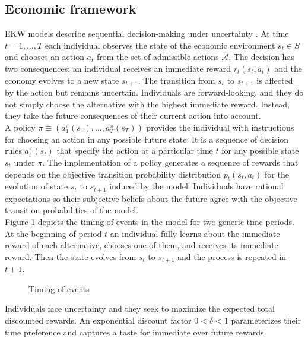 \subsection{Economic framework}
EKW models describe sequential decision-making under uncertainty \citep{Gilboa.2009, Machina.2014}. At time $t = 1, \hdots, T$ each individual observes the state of the economic environment $s_t\in S$ and chooses an action $a_t$ from the set of admissible actions $\mathcal{A}$. The decision has two consequences: an individual receives an immediate reward $r_t(s_t, a_t)$ and the economy evolves to a new state $s_{t + 1}$. The transition from $s_t$ to $s_{t + 1}$ is affected by the action but remains uncertain. Individuals are forward-looking, and they do not simply choose the alternative with the highest immediate reward. Instead, they take the future consequences of their current action into account.\\

\noindent A policy $\pi \equiv(a^\pi_1(s_1), \hdots, a^\pi_T(s_T))$ provides the individual with instructions for choosing an action in any possible future state. It is a sequence of decision rules $a^\pi_t(s_t)$ that specify the action at a particular time $t$ for any possible state $s_t$ under $\pi$. The implementation of a policy generates a sequence of rewards that depends on the objective transition probability distribution $p_t(s_t, a_t)$ for the evolution of state $s_t$ to $s_{t + 1}$ induced by the model. Individuals have rational expectations \citep{Lucas.1972, Muth.1961} so their subjective beliefs about the future agree with the objective transition probabilities of the model.\\

\noindent Figure \ref{Timing} depicts the timing of events in the model for two generic time periods. At the beginning of period $t$ an individual fully learns about the immediate reward of each alternative, chooses one of them, and receives its immediate reward. Then the state evolves from $s_t$ to $s_{t + 1}$ and the process is repeated in $t + 1$.
%
\begin{figure}\caption{Timing of events}\label{Timing}\vspace{1.0cm}\centering

\end{figure}
%
\noindent Individuals face uncertainty and they seek to maximize the expected total discounted rewards. An exponential discount factor $0 < \delta < 1$ parameterizes their time preference and captures a taste for immediate over future rewards.\\

